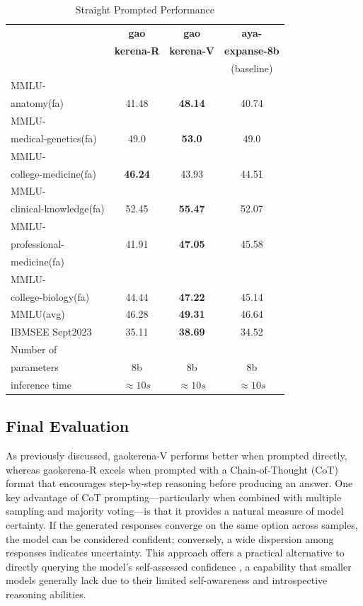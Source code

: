 \documentclass[conference]{IEEEtran}
\begin{document}
	\begin{table}[ht]
		\centering
		\caption{Straight Prompted Performance}
		\begin{tabular}{|l|c|c|c|}  
			\hline
			\textbf{} & \textbf{gao} & \textbf{gao} & \textbf{aya-} \\ 
			& \textbf{kerena-R} &  \textbf{kerena-V} & \textbf{expanse-8b} \\
			&   & &(baseline)  \\ \hline
			MMLU- &  &  &  \\ 
			anatomy(fa)  & 41.48 & \textbf{48.14}  & 40.74  \\ \hline
			MMLU- &    &   &   \\
			medical-genetics(fa) & 49.0  & \textbf{53.0}  &  49.0 \\ \hline
			MMLU- &  &    &  \\
			college-medicine(fa) & \textbf{46.24} & 43.93  & 44.51   \\ \hline
			MMLU- &    &  &  \\
			clinical-knowledge(fa) & 52.45 & \textbf{55.47}  & 52.07  \\ \hline
			MMLU- &  &  &  \\
			professional-& 41.91  & \textbf{47.05}  & 45.58   \\
                        medicine(fa)& &   &   \\ \hline
			MMLU- &  &  &  \\
			college-biology(fa)& 44.44 & \textbf{47.22}  &  45.14 \\ \hline
			MMLU(avg) & 46.28 & \textbf{49.31}  & 46.64 \\ \hline
			IBMSEE Sept2023 & 35.11  &\textbf{38.69} & 34.52  \\ \hline
			Number of&  &  &  \\
			parameters & 8b & 8b & 8b \\ \hline
			inference time & $\approx10s$ & $\approx 10s$ & $\approx 10s$ \\  \hline
		\end{tabular}
		\label{tab:med_knowledge_comparison}
	\end{table}


           \subsection{Final Evaluation}
As previously discussed, gaokerena-V performs better when prompted directly, whereas gaokerena-R excels when prompted with a Chain-of-Thought (CoT) format that encourages step-by-step reasoning before producing an answer. One key advantage of CoT prompting—particularly when combined with multiple sampling and majority voting—is that it provides a natural measure of model certainty. If the generated responses converge on the same option across samples, the model can be considered confident; conversely, a wide dispersion among responses indicates uncertainty. This approach offers a practical alternative to directly querying the model’s self-assessed confidence
\cite{b25}
, a capability that smaller models generally lack due to their limited self-awareness and introspective reasoning abilities.
\end{document}
